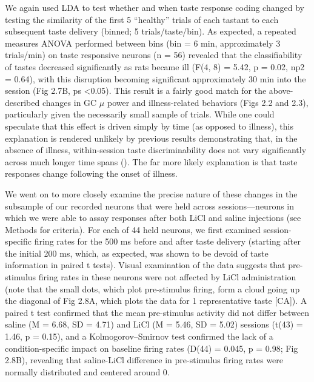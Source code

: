 \begin{refsection}
We again used LDA to test whether and when taste response coding changed by testing the similarity of the first 5 “healthy” trials of each tastant to each subsequent taste delivery (binned; 5 trials/taste/bin). As expected, a repeated measures ANOVA performed between bins (bin = 6 min, approximately 3 trials/min) on taste responsive neurons (n = 56) revealed that the classifiability of tastes decreased significantly as rats became ill (F(4, 8) = 5.42, p = 0.02, np2 = 0.64), with this disruption becoming significant approximately 30 min into the session (Fig 2.7B, ps \textless 0.05). This result is a fairly good match for the above-described changes in GC \(\mu\) power and illness-related behaviors (Figs 2.2 and 2.3), particularly given the necessarily small sample of trials. While one could speculate that this effect is driven simply by time (as opposed to illness), this explanation is rendered unlikely by previous results demonstrating that, in the absence of illness, within-session taste discriminability does not vary significantly across much longer time spans (\cite{fontanini2006a}). The far more likely explanation is that taste responses change following the onset of illness.

We went on to more closely examine the precise nature of these changes in the subsample of our recorded neurons that were held across sessions—neurons in which we were able to assay responses after both LiCl and saline injections (see Methods for criteria). For each of 44 held neurons, we first examined session-specific firing rates for the 500 ms before and after taste delivery (starting after the initial 200 ms, which, as expected, was shown to be devoid of taste information in paired t tests). Visual examination of the data suggests that pre-stimulus firing rates in these neurons were not affected by LiCl administration (note that the small dots, which plot pre-stimulus firing, form a cloud going up the diagonal of Fig 2.8A, which plots the data for 1 representative taste [CA]). A paired t test confirmed that the mean pre-stimulus activity did not differ between saline (M = 6.68, SD = 4.71) and LiCl (M = 5.46, SD = 5.02) sessions (t(43) = 1.46, p = 0.15), and a Kolmogorov–Smirnov test confirmed the lack of a condition-specific impact on baseline firing rates (D(44) = 0.045, p = 0.98; Fig 2.8B), revealing that saline-LiCl difference in pre-stimulus firing rates were normally distributed and centered around 0.


\end{refsection}
